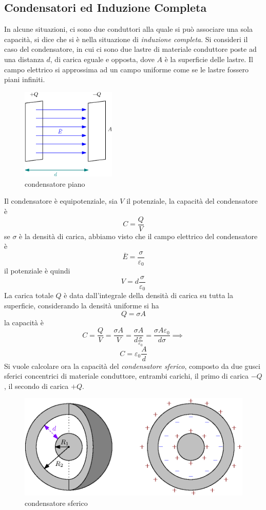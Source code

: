 \documentclass[10pt, letterpaper]{report}
\begin{document}
\subsection{Condensatori ed Induzione Completa}
In alcune situazioni, ci sono due conduttori alla quale si può associare una sola capacità, si dice che si è nella situazione di \textit{induzione completa}. Si consideri il caso del condensatore, in cui ci sono due lastre di materiale conduttore poste ad una distanza $d$, di carica eguale e opposta, dove $A$ è la superficie delle lastre. Il campo elettrico si approssima ad un campo uniforme come se le lastre fossero piani infiniti.\begin{figure}[h!]
    \centering
    \includegraphics[width=0.4\textwidth]{images/condensatore.eps}
    \caption{condensatore piano}
\end{figure}
Il condensatore è equipotenziale, sia $V$ il potenziale, la capacità del condensatore è 
$$ C=\frac{Q}{V}$$
se $\sigma$ è la densità di carica, abbiamo visto che il campo elettrico del condensatore è 
$$ \bar E = \frac{\sigma}{\varepsilon_0}$$il potenziale è quindi 
$$  V = d\frac{\sigma}{\varepsilon_0}$$
La carica totale $Q$ è data dall'integrale della densità di carica su tutta la superficie, considerando la densità uniforme si ha $$Q=\sigma A$$
la capacità è $$ C=\frac{Q}{ V}=\frac{\sigma A}{ V}=\frac{\sigma A }{d \frac{\sigma}{\varepsilon_0}}=\frac{\sigma A \varepsilon_0}{d \sigma}\implies $$
$$ C=\varepsilon_0\frac{A}{d}$$ 
Si vuole calcolare ora la capacità del \textit{condensatore sferico}, composto da due gusci sferici concentrici di materiale conduttore, entrambi carichi, il primo di carica $-Q$, il secondo di carica $+Q$.\begin{figure}[h!]
    \centering
    \includegraphics[width=1\textwidth]{images/condensatoreSferico.eps}
    \caption{condensatore sferico}
\end{figure}
\end{document}
